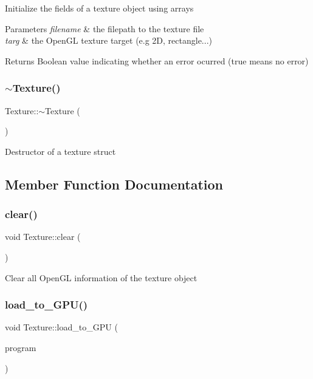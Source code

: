 Initialize the fields of a texture object using arrays


\begin{DoxyParams}{Parameters}
{\em filename} & the filepath to the texture file \\
\hline
{\em targ} & the Open\+GL texture target (e.\+g 2D, rectangle...) \\
\hline
\end{DoxyParams}
\begin{DoxyReturn}{Returns}
Boolean value indicating whether an error ocurred (true means no error) 
\end{DoxyReturn}
\mbox{\label{classTexture_a09c4bcb7462f64c1d20fa69dba3cee8a}} 
\subsubsection{\texorpdfstring{$\sim$\+Texture()}{~Texture()}}
{\footnotesize\ttfamily Texture\+::$\sim$\+Texture (\begin{DoxyParamCaption}{ }\end{DoxyParamCaption})}

Destructor of a texture struct 

\subsection{Member Function Documentation}
\mbox{\label{classTexture_ae02304cd1a555cd43b0af49162102a1a}} 
\subsubsection{\texorpdfstring{clear()}{clear()}}
{\footnotesize\ttfamily void Texture\+::clear (\begin{DoxyParamCaption}{ }\end{DoxyParamCaption})}

Clear all Open\+GL information of the texture object \mbox{\label{classTexture_a9db65830c1a20ad231183c498f711337}} 
\subsubsection{\texorpdfstring{load\+\_\+to\+\_\+\+G\+P\+U()}{load\_to\_GPU()}}
{\footnotesize\ttfamily void Texture\+::load\+\_\+to\+\_\+\+G\+PU (\begin{DoxyParamCaption}\item[{G\+Luint}]{program }\end{DoxyParamCaption})}



